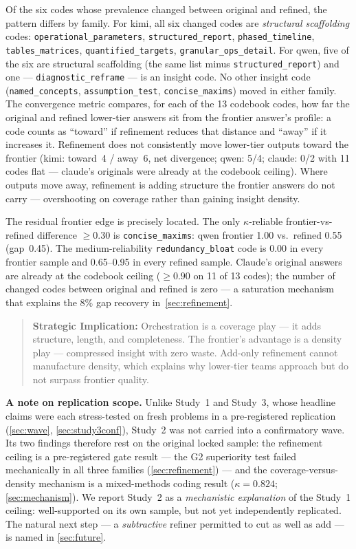 \documentclass[12pt,a4paper]{article}
\begin{document}
Of the six codes whose prevalence changed between original and refined, the
pattern differs by family. For kimi, all six changed codes are
\emph{structural scaffolding} codes: \texttt{operational\_parameters},
\texttt{structured\_report}, \texttt{phased\_timeline},
\texttt{tables\_matrices}, \texttt{quantified\_targets},
\texttt{granular\_ops\_detail}. For qwen, five of the six are structural
scaffolding (the same list minus \texttt{structured\_report}) and one ---
\texttt{diagnostic\_reframe} --- is an insight code. No other insight code
(\texttt{named\_concepts}, \texttt{assumption\_test},
\texttt{concise\_maxims}) moved in either family. The convergence metric compares, for each of the 13 codebook codes, how far
the original and refined lower-tier answers sit from the frontier answer's
profile: a code counts as ``toward'' if refinement reduces that distance and
``away'' if it increases it. Refinement does not consistently move lower-tier
outputs toward the frontier (kimi: toward~4 / away~6, net divergence; qwen:
5/4; claude: 0/2 with 11 codes flat --- claude's originals were already at the
codebook ceiling). Where outputs move away, refinement is adding structure the
frontier answers do not carry --- overshooting on coverage rather than gaining
insight density.

The residual frontier edge is precisely located. The only $\kappa$-reliable
frontier-vs-refined difference $\ge 0.30$ is \texttt{concise\_maxims}: qwen
frontier 1.00 vs.\ refined 0.55 (gap~0.45). The medium-reliability
\texttt{redundancy\_bloat} code is 0.00 in every frontier sample and 0.65--0.95
in every refined sample. Claude's original answers are already at the codebook
ceiling ($\ge 0.90$ on 11 of 13 codes); the number of changed codes between
original and refined is zero --- a saturation mechanism that explains the 8\%
gap recovery in~\cref{sec:refinement}.

\begin{quote}
\textbf{Strategic Implication:} Orchestration is a coverage play --- it adds
structure, length, and completeness. The frontier's advantage is a density
play --- compressed insight with zero waste. Add-only refinement cannot
manufacture density, which explains why lower-tier teams approach but do not surpass
frontier quality.
\end{quote}

\textbf{A note on replication scope.} Unlike Study~1 and Study~3, whose headline
claims were each stress-tested on fresh problems in a pre-registered replication
(\cref{sec:wave}, \cref{sec:study3conf}), Study~2 was not carried into a
confirmatory wave. Its two findings therefore rest on the original locked
sample: the refinement ceiling is a pre-registered gate result --- the G2
superiority test failed mechanically in all three families
(\cref{sec:refinement}) --- and the coverage-versus-density mechanism is a
mixed-methods coding result ($\kappa = 0.824$; \cref{sec:mechanism}). We report
Study~2 as a \emph{mechanistic explanation} of the Study~1 ceiling:
well-supported on its own sample, but not yet independently replicated. The
natural next step --- a \emph{subtractive} refiner permitted to cut as well as
add --- is named in \cref{sec:future}.
\end{document}
